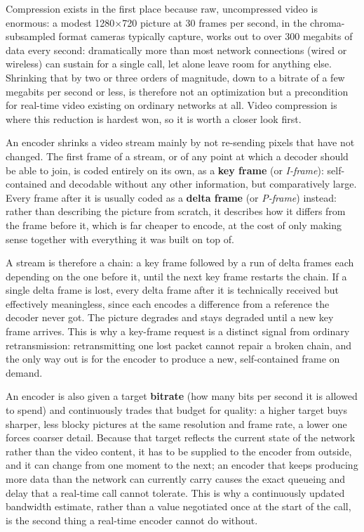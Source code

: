 \documentclass[11pt]{article}
\begin{document}
Compression exists in the first place because raw, uncompressed video is enormous: a modest 1280$\times$720 picture at 30 frames per second, in the chroma-subsampled format cameras typically capture, works out to over 300 megabits of data every second: dramatically more than most network connections (wired or wireless) can sustain for a single call, let alone leave room for anything else. Shrinking that by two or three orders of magnitude, down to a bitrate of a few megabits per second or less, is therefore not an optimization but a precondition for real-time video existing on ordinary networks at all. Video compression is where this reduction is hardest won, so it is worth a closer look first. 

An encoder shrinks a video stream mainly by not re-sending pixels that have not changed. The first frame of a stream, or of any point at which a decoder should be able to join, is coded entirely on its own, as a \textbf{key frame} (or \emph{I-frame}): self-contained and decodable without any other information, but comparatively large. Every frame after it is usually coded as a \textbf{delta frame} (or \emph{P-frame}) instead: rather than describing the picture from scratch, it describes how it differs from the frame before it, which is far cheaper to encode, at the cost of only making sense together with everything it was built on top of. 

A stream is therefore a chain: a key frame followed by a run of delta frames each depending on the one before it, until the next key frame restarts the chain. If a single delta frame is lost, every delta frame after it is technically received but effectively meaningless, since each encodes a difference from a reference the decoder never got. The picture degrades and stays degraded until a new key frame arrives. This is why a key-frame request is a distinct signal from ordinary retransmission: retransmitting one lost packet cannot repair a broken chain, and the only way out is for the encoder to produce a new, self-contained frame on demand.

An encoder is also given a target \textbf{bitrate} (how many bits per second it is allowed to spend) and continuously trades that budget for quality: a higher target buys sharper, less blocky pictures at the same resolution and frame rate, a lower one forces coarser detail. Because that target reflects the current state of the network rather than the video content, it has to be supplied to the encoder from outside, and it can change from one moment to the next; an encoder that keeps producing more data than the network can currently carry causes the exact queueing and delay that a real-time call cannot tolerate. This is why a continuously updated bandwidth estimate, rather than a value negotiated once at the start of the call, is the second thing a real-time encoder cannot do without.
\end{document}
